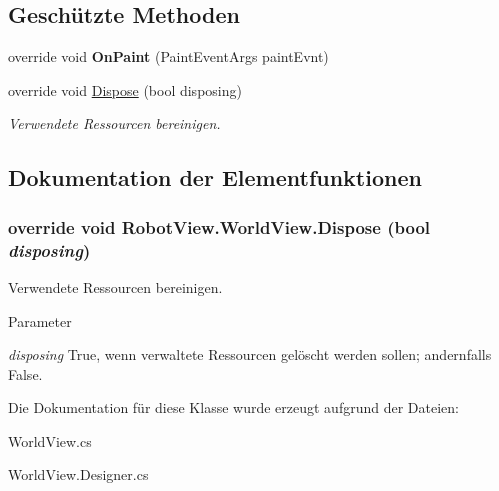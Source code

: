 \subsection*{Geschützte Methoden}
\begin{DoxyCompactItemize}
\item 
\hypertarget{class_robot_view_1_1_world_view_ad50b0a0a0c4bdc7e027eb536db6bba35}{
override void {\bfseries OnPaint} (PaintEventArgs paintEvnt)}
\label{class_robot_view_1_1_world_view_ad50b0a0a0c4bdc7e027eb536db6bba35}

\item 
override void \hyperlink{class_robot_view_1_1_world_view_ae412a0d88561b075a22955c6e0b41aca}{Dispose} (bool disposing)
\begin{DoxyCompactList}\small\item\em Verwendete Ressourcen bereinigen. \item\end{DoxyCompactList}\end{DoxyCompactItemize}


\subsection{Dokumentation der Elementfunktionen}
\hypertarget{class_robot_view_1_1_world_view_ae412a0d88561b075a22955c6e0b41aca}{
\subsubsection[{Dispose}]{\setlength{\rightskip}{0pt plus 5cm}override void RobotView.WorldView.Dispose (bool {\em disposing})}}
\label{class_robot_view_1_1_world_view_ae412a0d88561b075a22955c6e0b41aca}


Verwendete Ressourcen bereinigen. 


\begin{DoxyParams}{Parameter}
\item[{\em disposing}]True, wenn verwaltete Ressourcen gelöscht werden sollen; andernfalls False.\end{DoxyParams}


Die Dokumentation für diese Klasse wurde erzeugt aufgrund der Dateien:\begin{DoxyCompactItemize}
\item 
WorldView.cs\item 
WorldView.Designer.cs\end{DoxyCompactItemize}
